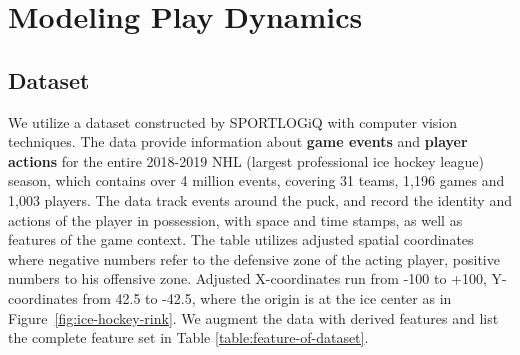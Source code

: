 \documentclass[letterpaper]{article} %
\begin{document}


\section{Modeling Play Dynamics}
\subsection{Dataset}
We utilize a dataset constructed by SPORTLOGiQ with computer vision techniques. 
The data provide information about \textbf{game events} and \textbf{player actions} for the entire 2018-2019 NHL (largest professional ice hockey league) season,
which contains over 4 million events, covering 31 teams, 1,196 games and 1,003 players. 
The data track events around the puck, and record the identity and actions of the player in possession, with space and time stamps, as well as features of the game context. 
The table utilizes adjusted spatial coordinates where negative numbers refer to the defensive zone of the acting player, positive numbers to his offensive zone. Adjusted X-coordinates run from -100 to +100, Y-coordinates from 42.5 to -42.5, where the origin is at the ice center as in Figure~\ref{fig:ice-hockey-rink}. We augment the data with derived features
and list the complete feature set in Table \ref{table:feature-of-dataset}.
\end{document}
